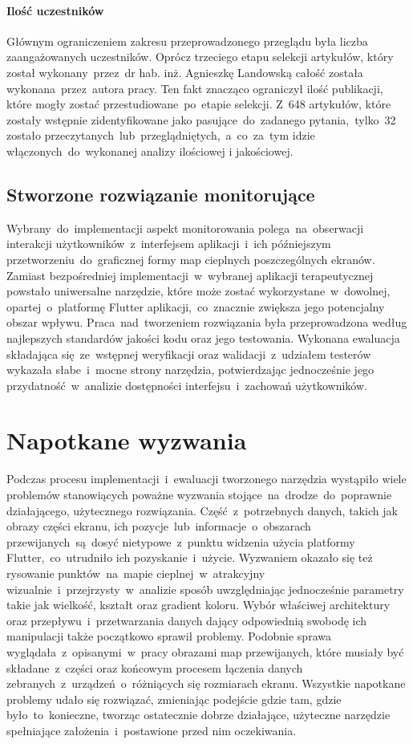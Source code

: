 \paragraph{Ilość uczestników}
Głównym ograniczeniem zakresu przeprowadzonego przeglądu była liczba zaangażowanych uczestników. Oprócz trzeciego etapu selekcji artykułów, który został wykonany~przez~dr hab. inż. Agnieszkę Landowską całość została wykonana~przez~autora pracy. Ten fakt znacząco ograniczył ilość publikacji, które mogły zostać przestudiowane~po~etapie selekcji. Z~648 artykułów, które zostały wstępnie zidentyfikowane jako pasujące~do~zadanego pytania,~tylko~32 zostało przeczytanych~lub~przeglądniętych,~a~co~za~tym idzie włączonych~do~wykonanej analizy ilościowej i jakościowej.

\subsection{Stworzone rozwiązanie monitorujące}
Wybrany~do~implementacji aspekt monitorowania polega~na~obserwacji interakcji użytkowników~z~interfejsem aplikacji~i~ich późniejszym przetworzeniu~do~graficznej formy map cieplnych poszczególnych ekranów. Zamiast bezpośredniej implementacji~w~wybranej aplikacji terapeutycznej powstało uniwersalne narzędzie, które może zostać wykorzystane~w~dowolnej, opartej~o~platformę Flutter aplikacji,~co~znacznie zwiększa jego potencjalny obszar wpływu. Praca~nad~tworzeniem rozwiązania była przeprowadzona według najlepszych standardów jakości kodu oraz jego testowania. Wykonana ewaluacja składająca się~ze~wstępnej weryfikacji oraz walidacji~z~udziałem testerów wykazała słabe~i~mocne strony narzędzia, potwierdzając jednocześnie jego przydatność~w~analizie dostępności interfejsu~i~zachowań użytkowników. 
	
\section{Napotkane wyzwania}
Podczas procesu implementacji~i~ewaluacji tworzonego narzędzia wystąpiło wiele problemów stanowiących poważne wyzwania stojące~na~drodze~do~poprawnie działającego, użytecznego rozwiązania. Część~z~potrzebnych danych, takich jak obrazy części ekranu, ich pozycje~lub~informacje~o~obszarach przewijanych~są~dosyć nietypowe~z~punktu widzenia użycia platformy Flutter,~co~utrudniło ich pozyskanie~i~użycie. Wyzwaniem okazało się też rysowanie punktów~na~mapie cieplnej~w~atrakcyjny wizualnie~i~przejrzysty~w~analizie sposób uwzględniając jednocześnie parametry takie jak wielkość, kształt oraz gradient koloru. Wybór właściwej architektury oraz przepływu~i~przetwarzania danych dający odpowiednią swobodę ich manipulacji także początkowo sprawił problemy. Podobnie sprawa wyglądała~z~opisanymi~w~pracy obrazami map przewijanych, które musiały być składane~z~części oraz końcowym procesem łączenia danych zebranych~z~urządzeń~o~różniących się rozmiarach ekranu. Wszystkie napotkane problemy udało się rozwiązać, zmieniając podejście gdzie tam, gdzie było~to~konieczne, tworząc ostatecznie dobrze działające, użyteczne narzędzie spełniające założenia~i~postawione przed nim oczekiwania.
